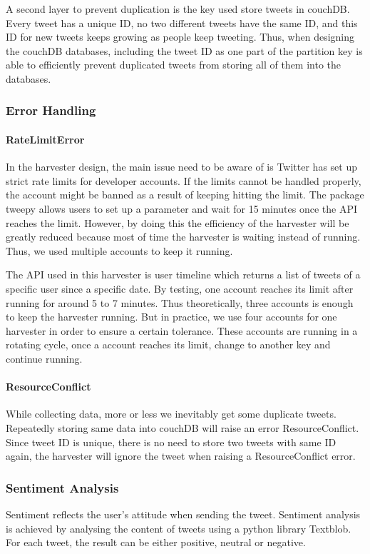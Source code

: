 A second layer to prevent duplication is the key used store tweets in couchDB. Every tweet has a unique ID, no two different tweets have the same ID, and this ID for new tweets keeps growing as people keep tweeting. Thus, when designing the couchDB databases, including the tweet ID as one part of the partition key is able to efficiently prevent duplicated tweets from storing all of them into the databases.
\subsubsection{Error Handling}
\paragraph{RateLimitError}In the harvester design, the main issue need to be aware of is Twitter has set up strict rate limits for developer accounts. If the limits cannot be handled properly, the account might be banned as a result of keeping hitting the limit.
The package tweepy allows users to set up a parameter and wait for 15 minutes once the API reaches the limit. However, by doing this the efficiency of the harvester will be greatly reduced because most of time the harvester is waiting instead of running. Thus, we used multiple accounts to keep it running.

The API used in this harvester is user timeline which returns a list of tweets of a specific user since a specific date. By testing, one account reaches its limit after running for around 5 to 7 minutes. Thus theoretically, three accounts is enough to keep the harvester running. But in practice, we use four accounts for one harvester in order to ensure a certain tolerance. These accounts are running in a rotating cycle, once a account reaches its limit, change to another key and continue running.

\paragraph{ResourceConflict}
While collecting data, more or less we inevitably get some duplicate tweets. Repeatedly storing same data into couchDB will raise an error ResourceConflict. Since tweet ID is unique, there is no need to store two tweets with same ID again, the harvester will ignore the tweet when raising a ResourceConflict error.

\subsubsection{Sentiment Analysis}
Sentiment reflects the user's attitude when sending the tweet. Sentiment analysis is achieved by analysing the content of tweets using a python library Textblob. For each tweet, the result can be either positive, neutral or negative.

